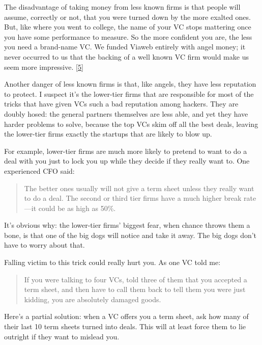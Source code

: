 The disadvantage of taking money from less known firms is that
people will assume, correctly or not, that you were turned down by
the more exalted ones.  But, like where you went to college, the
name of your VC stops mattering once you have some performance to
measure.  So the more confident you are, the less you need a
brand-name VC.  We funded Viaweb entirely with angel money; it never
occurred to us that the backing of a well known VC firm would make
us seem more impressive.
[\href{\#f5n}{5}]

Another danger of less known firms is that, like angels, they have
less reputation to protect.   I suspect it's the lower-tier firms
that are responsible for most of the tricks that have given VCs
such a bad reputation among hackers.  They are doubly hosed: the
general partners themselves are less able, and yet they have harder
problems to solve, because the top VCs skim off all the best deals,
leaving the lower-tier firms exactly the startups that are likely
to blow up.

For example, lower-tier firms are much more likely to pretend to
want to do a deal with you just to lock you up while they decide
if they really want to.  One experienced CFO said:
\begin{quote}

 The better ones usually will not give a term sheet unless they
 really want to do a deal. The second or third tier firms have a
 much higher break rate---it could be as high as 50\%.

\end{quote}

It's obvious why: the lower-tier firms' biggest fear, when chance
throws them a bone, is that one of the big dogs will notice and
take it away.  The big dogs don't have to worry about that.

Falling victim to this trick could really hurt you.  As one
VC told me:
\begin{quote}

  If you were talking to four VCs, told three of them that you
  accepted a term sheet, and then have to call them back to tell
  them you were just kidding, you are absolutely damaged goods.

\end{quote}

Here's a partial solution: when a VC offers you a term sheet, ask
how many of their last 10 term sheets turned into deals.  This will
at least force them to lie outright if they want to mislead you.

